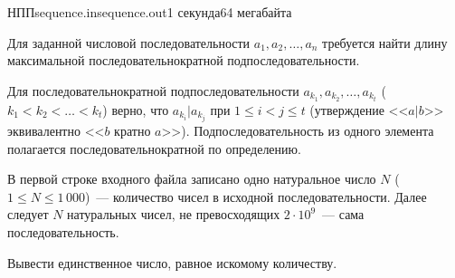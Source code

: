 \begin{problem}{НПП}{sequence.in}{sequence.out}{1 секунда}{64 мегабайта}

Для заданной числовой последовательности $a_1, a_2, \dots , a_n$ требуется найти длину максимальной последовательнократной подпоследовательности.

Для последовательнократной подпоследовательности $a_{k_1}, a_{k_2}, \dots, a_{k_t}$ ($k_1 < k_2 < \dots < k_t$) верно, что $a_{k_i} | a_{k_j}$ при $1 \le i < j \le t$ (утверждение <<$a|b$>> эквивалентно <<$b$ кратно $a$>>). Подпоследовательность из одного элемента полагается последовательнократной по определению.

\InputFile
В первой строке входного файла записано одно натуральное число $N$ ($1 \le N \le 1\,000$)~--- количество чисел в исходной последовательности. Далее следует $N$ натуральных чисел, не превосходящих $2\cdot10^9$~--- сама последовательность.

\OutputFile
Вывести единственное число, равное искомому количеству.

\Examples

\begin{example}
%
\end{example}

\end{problem}
